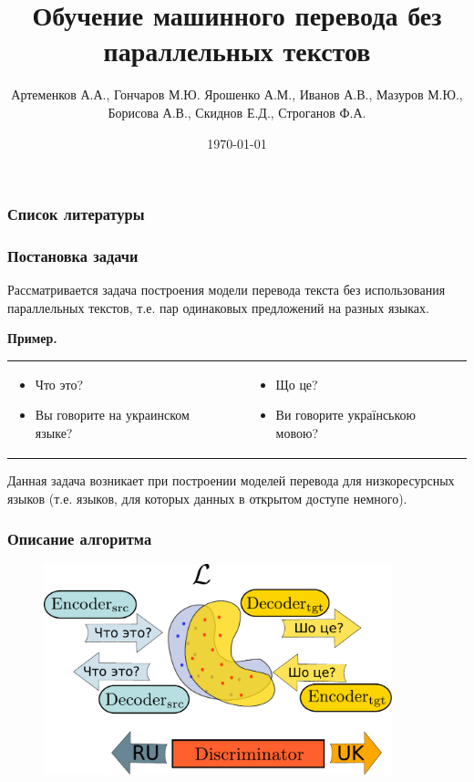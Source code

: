 \documentclass[10pt,pdf,hyperref={unicode}]{beamer}
\title{Обучение машинного перевода без параллельных текстов}
\subtitle{}
\author{Артеменков А.А., Гончаров М.Ю. Ярошенко А.М., Иванов А.В., Мазуров М.Ю., Борисова А.В., Скиднов Е.Д., Строганов Ф.А.}
\date{\today}
\begin{document}
\begin{frame}
	\titlepage
\end{frame}


\begin{frame}
	\frametitle{Список литературы}
	\nocite{lample2017unsupervised} 
	\nocite{graves2005framewise}
	\nocite{kimimproving}
	\nocite{papineni2002bleu}
	
	
\end{frame}

\begin{frame}
	\frametitle{Постановка задачи}
	
	
	Рассматривается задача построения модели перевода текста без использования параллельных текстов, т.е. пар одинаковых предложений на разных языках.
	
	\textbf{Пример.}
	
	
	\begin{table}[ht]
		\centering
		\begin{tabular}{p{4cm}c| p{4cm}}
			\begin{itemize}
				\item Что это?
				
				\item Вы говорите на украинском языке? 
			\end{itemize}
			& \hfill & 
			\begin{itemize}
				
				\item Що це?
				
				\item Ви говорите українською мовою?
			\end{itemize}
		\end{tabular}
	\end{table}
	
	
	Данная задача возникает при построении моделей перевода для низкоресурсных языков (т.е. языков, для которых данных в открытом доступе немного).
	
	
\end{frame}

\begin{frame}
\frametitle{Описание алгоритма}

\begin{figure}[h]
	\centering
	\includegraphics[width=0.9\textwidth]{drawing}
\end{figure}

\end{frame}
\end{document}
